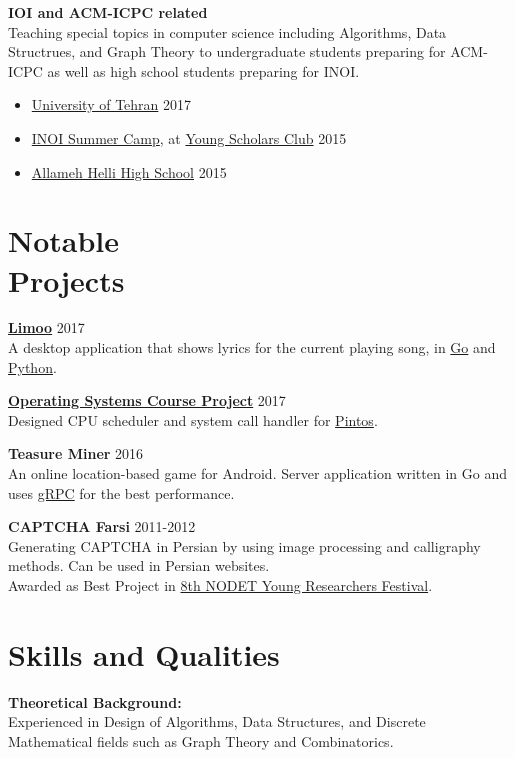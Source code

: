 \documentclass[margin]{res}
\begin{document}
\begin{resume}
    {\bf IOI and ACM-ICPC related}
    \\Teaching special topics in computer science including Algorithms, Data Structrues,
    and Graph Theory to undergraduate students preparing for ACM-ICPC as well as high school
    students preparing for INOI.
    	\begin{itemize}
		\item \href{http://ut.ac.ir/en}{University of Tehran} \hfill 2017
		\item \href{http://inoi.ir/}{INOI Summer Camp}, at \href{http://ysc.ac.ir/}{Young Scholars Club} \hfill 2015
	    \item \href{http://www.helli.ir/}{Allameh Helli High School} \hfill 2015
	\end{itemize}

\section{Notable \\ Projects}
	{\bf \href{https://github.com/shayanh/limoo}{Limoo}} \hfill 2017
	\\A desktop application that shows lyrics for the current playing song, in \href{https://github.com/shayanh/limoo-server}{Go} and \href{https://github.com/shayanh/limoo}{Python}.
	
	{\bf \href{https://github.com/shayanh/pintos}{Operating Systems Course Project}} \hfill 2017
	\\Designed CPU scheduler and system call handler for \href{https://en.wikipedia.org/wiki/Pintos}{Pintos}.
	
	{\bf Teasure Miner} \hfill 2016
	\\An online location-based game for Android. Server application written in Go and uses \href{https://grpc.io/}{gRPC} for the best performance.
	
	{\bf CAPTCHA Farsi} \hfill 2011-2012
	\\Generating CAPTCHA in Persian by using image processing and calligraphy methods. Can be used in Persian websites.
	\\Awarded as Best Project in \href{
	http://www.helli.ir/portal/content/تقدیر-از-دانش-آموزان-برترپژوهشگر	
	}{8th NODET Young Researchers Festival}.

\section{Skills and Qualities} 
    {\bf Theoretical Background:}
    \\Experienced in Design of Algorithms, Data Structures, and Discrete Mathematical fields such as Graph Theory and Combinatorics.


\end{resume}
\end{document}
